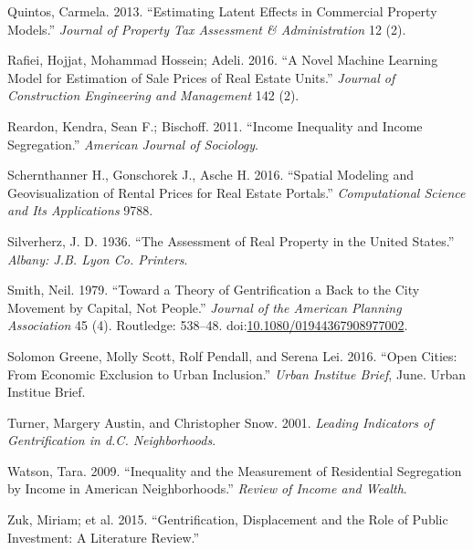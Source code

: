 \documentclass[]{article}
\begin{document}
\hypertarget{ref-Quintos2013}{}
Quintos, Carmela. 2013. ``Estimating Latent Effects in Commercial
Property Models.'' \emph{Journal of Property Tax Assessment \&
Administration} 12 (2).

\hypertarget{ref-Rafiei2016}{}
Rafiei, Hojjat, Mohammad Hossein; Adeli. 2016. ``A Novel Machine
Learning Model for Estimation of Sale Prices of Real Estate Units.''
\emph{Journal of Construction Engineering and Management} 142 (2).

\hypertarget{ref-Reardon2011}{}
Reardon, Kendra, Sean F.; Bischoff. 2011. ``Income Inequality and Income
Segregation.'' \emph{American Journal of Sociology}.

\hypertarget{ref-Schernthanner2016}{}
Schernthanner H., Gonschorek J., Asche H. 2016. ``Spatial Modeling and
Geovisualization of Rental Prices for Real Estate Portals.''
\emph{Computational Science and Its Applications} 9788.

\hypertarget{ref-Silverherz1936}{}
Silverherz, J. D. 1936. ``The Assessment of Real Property in the United
States.'' \emph{Albany: J.B. Lyon Co. Printers}.

\hypertarget{ref-Smith1979}{}
Smith, Neil. 1979. ``Toward a Theory of Gentrification a Back to the
City Movement by Capital, Not People.'' \emph{Journal of the American
Planning Association} 45 (4). Routledge: 538--48.
doi:\href{https://doi.org/10.1080/01944367908977002}{10.1080/01944367908977002}.

\hypertarget{ref-urban2016}{}
Solomon Greene, Molly Scott, Rolf Pendall, and Serena Lei. 2016. ``Open
Cities: From Economic Exclusion to Urban Inclusion.'' \emph{Urban
Institue Brief}, June. Urban Institue Brief.

\hypertarget{ref-Turner2001}{}
Turner, Margery Austin, and Christopher Snow. 2001. \emph{Leading
Indicators of Gentrification in d.C. Neighborhoods}.

\hypertarget{ref-Watson2009}{}
Watson, Tara. 2009. ``Inequality and the Measurement of Residential
Segregation by Income in American Neighborhoods.'' \emph{Review of
Income and Wealth}.

\hypertarget{ref-Zuk2015}{}
Zuk, Miriam; et al. 2015. ``Gentrification, Displacement and the Role of
Public Investment: A Literature Review.''
\end{document}
